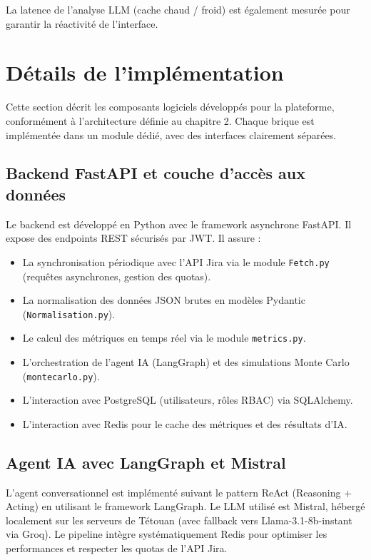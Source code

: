 La latence de l’analyse LLM (cache chaud / froid) est également mesurée pour garantir la réactivité de l’interface.


\section{Détails de l’implémentation}
Cette section décrit les composants logiciels développés pour la plateforme, conformément à l’architecture définie au chapitre 2. Chaque brique est implémentée dans un module dédié, avec des interfaces clairement séparées.

\subsection{Backend FastAPI et couche d’accès aux données}
Le backend est développé en Python avec le framework asynchrone FastAPI. Il expose des endpoints REST sécurisés par JWT. Il assure :
\begin{itemize}
    \renewcommand{\labelitemi}{—}
    \item La synchronisation périodique avec l’API Jira via le module \texttt{Fetch.py} (requêtes asynchrones, gestion des quotas).
    \item La normalisation des données JSON brutes en modèles Pydantic (\texttt{Normalisation.py}).
    \item Le calcul des métriques en temps réel via le module \texttt{metrics.py}.
    \item L’orchestration de l’agent IA (LangGraph) et des simulations Monte Carlo (\texttt{montecarlo.py}).
    \item L’interaction avec PostgreSQL (utilisateurs, rôles RBAC) via SQLAlchemy.
    \item L’interaction avec Redis pour le cache des métriques et des résultats d’IA.
\end{itemize}

\subsection{Agent IA avec LangGraph et Mistral}

L’agent conversationnel est implémenté suivant le pattern ReAct (Reasoning + Acting) en utilisant le framework LangGraph. Le LLM utilisé est Mistral, hébergé localement sur les serveurs de Tétouan (avec fallback vers Llama-3.1-8b-instant via Groq). Le pipeline intègre systématiquement Redis pour optimiser les performances et respecter les quotas de l’API Jira.

